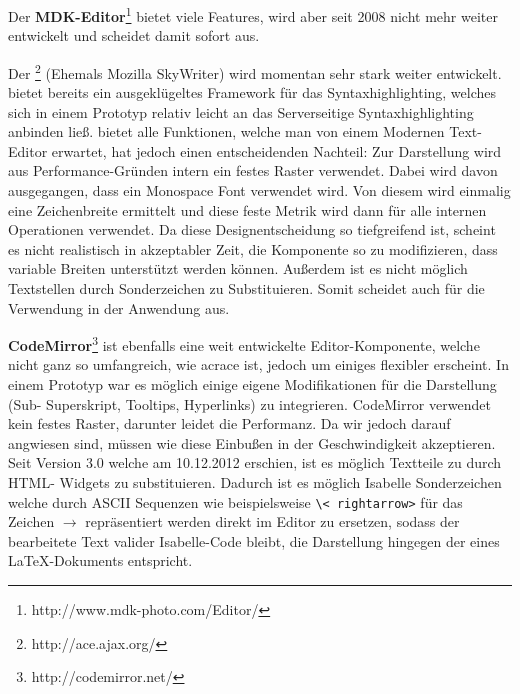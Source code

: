 \begin{description} 

\item {Der \textbf{MDK-Editor}\footnote{http://www.mdk-photo.com/Editor/}} bietet viele Features, wird
aber seit 2008 nicht mehr weiter entwickelt und scheidet damit sofort aus.

\item {Der \textbf{}\footnote{http://ace.ajax.org/}} (Ehemals Mozilla SkyWriter) wird
momentan sehr stark weiter entwickelt.  bietet bereits ein ausgeklügeltes Framework für das
Syntaxhighlighting, welches sich in einem Prototyp relativ leicht an das Serverseitige
Syntaxhighlighting anbinden ließ.  bietet alle Funktionen, welche man von einem Modernen
Text-Editor erwartet, hat jedoch einen entscheidenden Nachteil: Zur Darstellung wird aus
Performance-Gründen intern ein festes Raster verwendet. Dabei wird davon ausgegangen, dass ein
Monospace Font verwendet wird. Von diesem wird einmalig eine Zeichenbreite ermittelt und diese feste
Metrik wird dann für alle internen Operationen verwendet. Da diese Designentscheidung so
tiefgreifend ist, scheint es nicht realistisch in akzeptabler Zeit, die Komponente so zu
modifizieren, dass variable Breiten unterstützt werden können. Außerdem ist es nicht möglich
Textstellen durch Sonderzeichen zu Substituieren. Somit scheidet auch  für die Verwendung
in der Anwendung aus.

\item {\textbf{CodeMirror}\footnote{http://codemirror.net/}} ist ebenfalls eine weit entwickelte
Editor-Komponente, welche nicht ganz so umfangreich, wie acr{ace} ist, jedoch um einiges flexibler
erscheint. In einem Prototyp war es möglich einige eigene Modifikationen für die Darstellung (Sub-
Superskript, Tooltips, Hyperlinks) zu integrieren. CodeMirror verwendet kein festes Raster, darunter
leidet die Performanz. Da wir jedoch darauf angwiesen sind, müssen wie diese Einbußen in der
Geschwindigkeit akzeptieren. Seit Version 3.0 welche am 10.12.2012 erschien, ist es möglich
Textteile zu durch HTML- Widgets zu substituieren. Dadurch ist es möglich Isabelle Sonderzeichen
welche durch ASCII Sequenzen wie beispielsweise \texttt{\textbackslash\textless
rightarrow\textgreater} für das Zeichen $\rightarrow$ repräsentiert werden direkt im Editor zu
ersetzen, sodass der bearbeitete Text valider Isabelle-Code bleibt, die Darstellung hingegen der
eines LaTeX-Dokuments entspricht.

\end{description}

